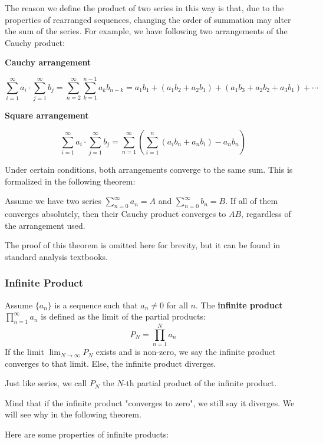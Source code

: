 The reason we define the product of two series in this way is that, due to the properties of rearranged sequences, changing the order of summation may alter the sum of the series. For example, we have following two arrangements of the Cauchy product:

\textbf{Cauchy arrangement}

\[
\sum_{i=1}^{\infty} a_i \cdot \sum_{j=1}^{\infty} b_j = \sum_{n=2}^{\infty} \sum_{k=1}^{n-1} a_k b_{n-k} = a_1 b_1 + (a_1 b_2 + a_2 b_1) + (a_1 b_3 + a_2 b_2 + a_3 b_1) + \cdots
\]

\textbf{Square arrangement}

\[
\sum_{i=1}^{\infty} a_i \cdot \sum_{j=1}^{\infty} b_j = \sum_{n=1}^{\infty} \left(\sum_{i=1}^{n}(a_i b_n+ a_n b_i) - a_n b_n \right)
\]

Under certain conditions, both arrangements converge to the same sum. This is formalized in the following theorem:

\begin{theorem}
    Assume we have two series $\sum_{n=0}^{\infty} a_n = A$ and $\sum_{n=0}^{\infty} b_n = B$. If all of them converges absolutely, then their Cauchy product converges to $AB$, regardless of the arrangement used.
\end{theorem}

The proof of this theorem is omitted here for brevity, but it can be found in standard analysis textbooks.

\subsubsection{Infinite Product}
\begin{definition}
    Assume $\{a_n\}$ is a sequence such that $a_n \neq 0$ for all $n$. The \textbf{infinite product} $\prod_{n=1}^{\infty} a_n$ is defined as the limit of the partial products:
    \[ P_N = \prod_{n=1}^{N} a_n \]
    If the limit $\lim_{N \to \infty} P_N$ exists and is non-zero, we say the infinite product converges to that limit.
    Else, the infinite product diverges.
\end{definition}

Just like series, we call $P_N$ the $N$-th partial product of the infinite product.

Mind that if the infinite product "converges to zero", we still say it diverges. We will see why in the following theorem.

Here are some properties of infinite products:

